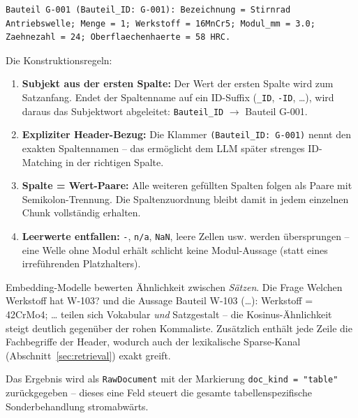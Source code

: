 \documentclass[12pt, a4paper]{article}
\begin{document}
\begin{lstlisting}[style=datastyle, caption={Nachher: Satzform, wie sie eingebettet und indexiert wird}]
Bauteil G-001 (Bauteil_ID: G-001): Bezeichnung = Stirnrad Antriebswelle; Menge = 1; Werkstoff = 16MnCr5; Modul_mm = 3.0; Zaehnezahl = 24; Oberflaechenhaerte = 58 HRC.
\end{lstlisting}

Die Konstruktionsregeln:

\begin{enumerate}[itemsep=2pt]
  \item \textbf{Subjekt aus der ersten Spalte:} Der Wert der ersten Spalte wird
        zum Satzanfang. Endet der Spaltenname auf ein ID-Suffix
        (\texttt{\_ID}, \texttt{-ID}, \dots), wird daraus das Subjektwort
        abgeleitet: \texttt{Bauteil\_ID} $\rightarrow$ \glqq Bauteil G-001\grqq.
  \item \textbf{Expliziter Header-Bezug:} Die Klammer
        \texttt{(Bauteil\_ID: G-001)} nennt den exakten Spaltennamen -- das
        ermöglicht dem LLM später strenges ID-Matching in der richtigen Spalte.
  \item \textbf{\glqq Spalte = Wert\grqq-Paare:} Alle weiteren gefüllten Spalten
        folgen als Paare mit Semikolon-Trennung. Die Spaltenzuordnung bleibt
        damit in jedem einzelnen Chunk vollständig erhalten.
  \item \textbf{Leerwerte entfallen:} \texttt{-}, \texttt{n/a}, \texttt{NaN},
        leere Zellen usw. werden übersprungen -- eine Welle ohne Modul erhält
        schlicht keine Modul-Aussage (statt eines irreführenden Platzhalters).
\end{enumerate}

\begin{infobox}
Embedding-Modelle bewerten Ähnlichkeit zwischen \emph{Sätzen}. Die Frage
\glqq Welchen Werkstoff hat W-103?\grqq{} und die Aussage
\glqq Bauteil W-103 (\dots): Werkstoff = 42CrMo4; \dots\grqq{} teilen sich
Vokabular \emph{und} Satzgestalt -- die Kosinus-Ähnlichkeit steigt deutlich
gegenüber der rohen Kommaliste. Zusätzlich enthält jede Zeile die Fachbegriffe
der Header, wodurch auch der lexikalische Sparse-Kanal
(Abschnitt~\ref{sec:retrieval}) exakt greift.
\end{infobox}

Das Ergebnis wird als \texttt{RawDocument} mit der Markierung
\texttt{doc\_kind = "table"} zurückgegeben -- dieses eine Feld steuert die
gesamte tabellenspezifische Sonderbehandlung stromabwärts.
\end{document}
